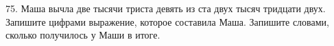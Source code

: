 75. Маша вычла две тысячи триста девять из ста двух тысяч тридцати двух. Запишите цифрами выражение, которое составила Маша. Запишите словами, сколько получилось у Маши в итоге.\\
